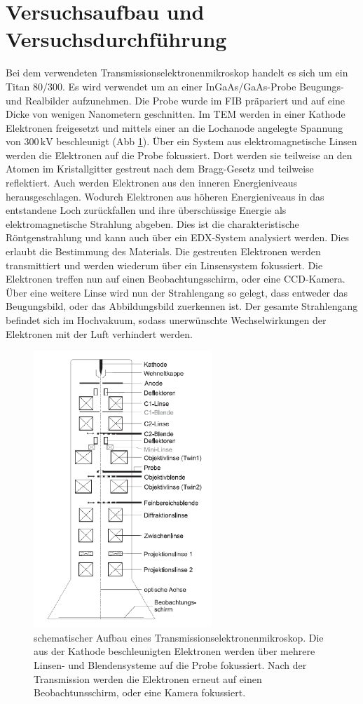 \documentclass[a4paper,11pt,DIV=11]{scrartcl}
\begin{document}
\section{Versuchsaufbau und Versuchsdurchführung}
Bei dem verwendeten Transmissionselektronenmikroskop handelt es sich um ein Titan 80/300. Es wird verwendet um an einer InGaAs/GaAs-Probe Beugungs- und Realbilder aufzunehmen. Die Probe wurde im FIB präpariert und auf eine Dicke von wenigen Nanometern geschnitten. Im TEM werden in einer Kathode Elektronen freigesetzt und mittels einer an die Lochanode angelegte Spannung von \(300\,\mathrm{kV}\) beschleunigt (Abb \ref{TEM}). Über ein System aus elektromagnetische Linsen werden die Elektronen auf die Probe fokussiert. Dort werden sie teilweise an den Atomen im Kristallgitter gestreut nach dem Bragg-Gesetz und teilweise reflektiert. Auch werden Elektronen aus den inneren Energieniveaus herausgeschlagen. Wodurch Elektronen aus höheren Energieniveaus in das entstandene Loch zurückfallen und ihre überschüssige Energie als elektromagnetische Strahlung abgeben. Dies ist die charakteristische Röntgenstrahlung und kann auch über ein EDX-System analysiert werden. Dies erlaubt die Bestimmung des Materials.
Die gestreuten Elektronen werden transmittiert und werden wiederum über ein Linsensystem fokussiert. Die Elektronen treffen nun auf einen Beobachtungsschirm, oder eine CCD-Kamera. Über eine weitere Linse wird nun der Strahlengang so gelegt, dass entweder das Beugungsbild, oder das Abbildungsbild zuerkennen ist. Der gesamte Strahlengang befindet sich im Hochvakuum, sodass unerwünschte Wechselwirkungen der Elektronen mit der Luft verhindert werden.
\begin{figure}[H]
\center
\includegraphics[width=0.6\textwidth]{tem.png}
\caption{schematischer Aufbau eines Transmissionselektronenmikroskop. Die aus der Kathode beschleunigten Elektronen werden über mehrere Linsen- und Blendensysteme auf die Probe fokussiert. Nach der Transmission werden die Elektronen erneut auf einen Beobachtunsschirm, oder eine Kamera fokussiert.}
\label{TEM}
\end{figure}
\end{document}
